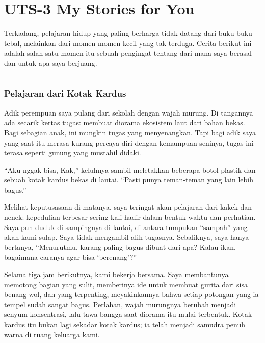 \documentclass[
  letterpaper,
  DIV=11,
  numbers=noendperiod]{scrreprt}
\begin{document}

\chapter{UTS-3 My Stories for You}\label{uts-3-my-stories-for-you}

Terkadang, pelajaran hidup yang paling berharga tidak datang dari
buku-buku tebal, melainkan dari momen-momen kecil yang tak terduga.
Cerita berikut ini adalah salah satu momen itu sebuah pengingat tentang
dari mana saya berasal dan untuk apa saya berjuang.

\begin{center}\rule{0.5\linewidth}{0.5pt}\end{center}

\subsection{Pelajaran dari Kotak
Kardus}\label{pelajaran-dari-kotak-kardus}

Adik perempuan saya pulang dari sekolah dengan wajah murung. Di
tangannya ada secarik kertas tugas: membuat diorama ekosistem laut dari
bahan bekas. Bagi sebagian anak, ini mungkin tugas yang menyenangkan.
Tapi bagi adik saya yang saat itu merasa kurang percaya diri dengan
kemampuan seninya, tugas ini terasa seperti gunung yang mustahil didaki.

``Aku nggak bisa, Kak,'' keluhnya sambil meletakkan beberapa botol
plastik dan sebuah kotak kardus bekas di lantai. ``Pasti punya
teman-teman yang lain lebih bagus.''

Melihat keputusasaan di matanya, saya teringat akan pelajaran dari kakek
dan nenek: kepedulian terbesar sering kali hadir dalam bentuk waktu dan
perhatian. Saya pun duduk di sampingnya di lantai, di antara tumpukan
``sampah'' yang akan kami sulap. Saya tidak mengambil alih tugasnya.
Sebaliknya, saya hanya bertanya, ``Menurutmu, karang paling bagus dibuat
dari apa? Kalau ikan, bagaimana caranya agar bisa `berenang'?''

Selama tiga jam berikutnya, kami bekerja bersama. Saya membantunya
memotong bagian yang sulit, memberinya ide untuk membuat gurita dari
sisa benang wol, dan yang terpenting, meyakinkannya bahwa setiap
potongan yang ia tempel sudah sangat bagus. Perlahan, wajah murungnya
berubah menjadi senyum konsentrasi, lalu tawa bangga saat diorama itu
mulai terbentuk. Kotak kardus itu bukan lagi sekadar kotak kardus; ia
telah menjadi samudra penuh warna di ruang keluarga kami.
\end{document}

